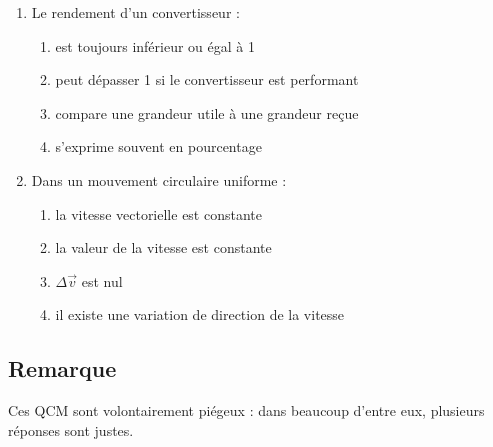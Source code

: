 \documentclass[11pt,a4paper]{article}
\begin{document}
\begin{enumerate}[label=\textbf{QCM \arabic*.},leftmargin=*]
\begin{enumerate}[label=\alph*)]
\item on peut la modéliser par une source idéale seule
\item sa tension à vide est égale à sa tension en charge dans tous les cas
\item une résistance interne peut provoquer des pertes
\item sa caractéristique peut être affine
\end{enumerate}
\item Le rendement d'un convertisseur :
\begin{enumerate}[label=\alph*)]
\item est toujours inférieur ou égal à 1
\item peut dépasser 1 si le convertisseur est performant
\item compare une grandeur utile à une grandeur reçue
\item s'exprime souvent en pourcentage
\end{enumerate}
\item Dans un mouvement circulaire uniforme :
\begin{enumerate}[label=\alph*)]
\item la vitesse vectorielle est constante
\item la valeur de la vitesse est constante
\item $\Delta\vec v$ est nul
\item il existe une variation de direction de la vitesse
\end{enumerate}
\end{enumerate}
\subsection*{Remarque} Ces QCM sont volontairement piégeux : dans beaucoup d'entre eux, plusieurs réponses sont justes.
\end{document}
